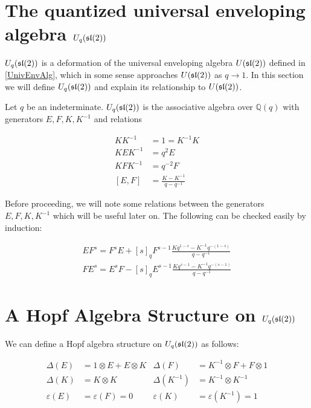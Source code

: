 \section{The quantized universal enveloping algebra $U_q(\mathfrak{sl}(2))$}

$U_q(\mathfrak{sl}(2))$ is a deformation of the universal enveloping algebra
$U(\mathfrak{sl}(2))$ defined in \ref{UnivEnvAlg}, which in some sense approaches
$U(\mathfrak{sl}(2))$ as $q \to 1$. In this section we will define $U_q(\mathfrak{sl}(2))$ and
explain its relationship to $U(\mathfrak{sl}(2))$.


Let $q$ be an indeterminate. $U_q(\mathfrak{sl}(2))$ is the associative algebra over
$\mathbb{Q}(q)$ with generators $E,F,K, K^{-1}$ and relations 

\begin{align}
    KK^{-1} &= 1 = K^{-1}K \\
    KEK^{-1} &= q^2 E \\
    KFK^{-1} &= q^{-2} F \\
    [E,F] &= \frac{K - K^{-1}}{q - q^{-1}}
\end{align}

%
% 

Before proceeding, we will note some relations between the generators
$E,F,K,K^{-1}$ which will be useful later on. The following can be checked
easily by induction:

\begin{align}
    \label{EFrelations}
    EF^s = F^sE + [s]_q F^{s-1} \frac{Kq^{1-s} - K^{-1} q^{-(1-s)}}{q-q^{-1}} \\
    FE^s = E^sF - [s]_q E^{s-1} \frac{Kq^{s-1} - K^{-1} q^{-(s-1)}}{q-q^{-1}}
\end{align}

\section{A Hopf Algebra Structure on $U_q(\mathfrak{sl}(2))$}
We can define a Hopf algebra structure on $U_q(\mathfrak{sl}(2))$ as follows:

\begin{align}
    \Delta(E) &= 1 \otimes E + E \otimes K &  \Delta(F) &= K^{-1} \otimes F + F \otimes 1 \\
    \Delta(K) &= K \otimes K &  \Delta(K^{-1}) &= K^{-1} \otimes K^{-1}\\ 
    \varepsilon(E) &= \varepsilon(F) = 0 &  \varepsilon(K) &= \varepsilon(K^{-1}) = 1
\end{align}

